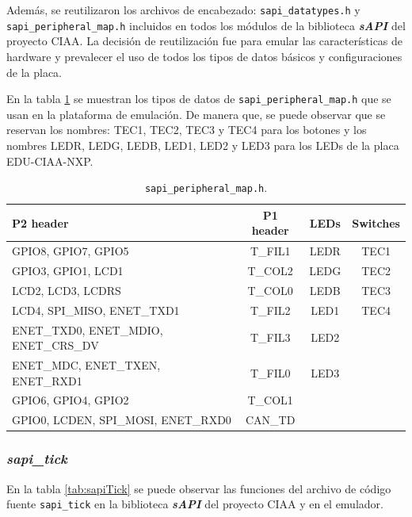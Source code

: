 Además, se reutilizaron los archivos de encabezado: \texttt{sapi\_datatypes.h} y \newline \texttt{sapi\_peripheral\_map.h} incluidos en todos los módulos de la biblioteca \textit{\textbf{sAPI}} del proyecto CIAA. La decisión de reutilización fue para emular las características de hardware y prevalecer el uso de todos los tipos de datos básicos y configuraciones de la placa.

En la tabla \ref{tab:ConfiguracionGPIO} se muestran los tipos de datos de \texttt{sapi\_peripheral\_map.h} que se usan en la plataforma de emulación. De manera que, se puede observar que se reservan los nombres: TEC1, TEC2, TEC3 y TEC4 para los botones y los nombres LEDR, LEDG, LEDB, LED1, LED2 y LED3 para los LEDs de la placa EDU-CIAA-NXP.

\begin{table}[h]
	\centering
	\caption[\texttt{sapi\_peripheral\_map.h}.]{\texttt{sapi\_peripheral\_map.h}.}
	\begin{tabular}{l c c c}    
		\toprule
		\textbf{P2 header} & \textbf{P1 header} & \textbf{LEDs}  & \textbf{Switches}\\
		\midrule
		GPIO8, GPIO7, GPIO5 & T\_FIL1 &  LEDR &  TEC1\\		
		GPIO3, GPIO1, LCD1 & T\_COL2  & LEDG &  TEC2\\
		LCD2, LCD3, LCDRS & T\_COL0 & LEDB &  TEC3\\
		LCD4, SPI\_MISO, ENET\_TXD1 & T\_FIL2 & LED1 & TEC4\\
		ENET\_TXD0, ENET\_MDIO, ENET\_CRS\_DV & T\_FIL3 & LED2 & \\
	    ENET\_MDC, ENET\_TXEN, ENET\_RXD1 & T\_FIL0 & LED3 & \\
	    GPIO6, GPIO4, GPIO2 & T\_COL1&  & \\
	    GPIO0, LCDEN, SPI\_MOSI, ENET\_RXD0 & CAN\_TD&  & \\
		\bottomrule
		\hline
	\end{tabular}
	\label{tab:ConfiguracionGPIO}
\end{table}



\subsubsection{\textit{\textbf{sapi\_tick}}}

En la tabla \ref{tab:sapiTick} se puede observar las funciones del archivo de código fuente \texttt{sapi\_tick} en la biblioteca \textit{\textbf{sAPI}} del proyecto CIAA y en el emulador.

